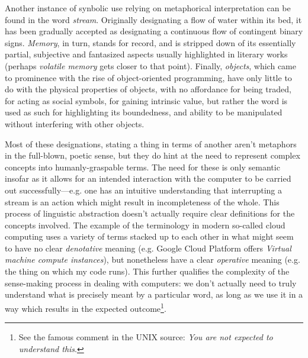 \documentclass{article}
\begin{document}
Another instance of synbolic use relying on metaphorical interpretation can be found in the word \emph{stream}. Originally designating a flow of water within its bed, it has been gradually accepted as designating a continuous flow of contingent binary signs. \emph{Memory}, in turn, stands for record, and is stripped down of its essentially partial, subjective and fantasized aspects usually highlighted in literary works (perhaps \emph{volatile memory} gets closer to that point). Finally, \emph{objects}, which came to prominence with the rise of object-oriented programming, have only little to do with the physical properties of objects, with no affordance for being traded, for acting as social symbols, for gaining intrinsic value, but rather the word is used as such for highlighting its boundedness, and ability to be manipulated without interfering with other objects.

Most of these designations, stating a thing in terms of another aren't metaphors in the full-blown, poetic sense, but they do hint at the need to represent complex concepts into humanly-graspable terms. The need for these is only semantic insofar as it allows for an intended interaction with the computer to be carried out successfully—e.g. one has an intuitive understanding that interrupting a stream is an action which might result in incompleteness of the whole. This process of linguistic abstraction doesn't actually require clear definitions for the concepts involved. The example of the terminology in modern so-called cloud computing uses a variety of terms stacked up to each other in what might seem to have no clear \emph{denotative} meaning (e.g. Google Cloud Platform offers \emph{Virtual machine compute instances}), but nonetheless have a clear \emph{operative} meaning (e.g. the thing on which my code runs). This further qualifies the complexity of the sense-making process in dealing with computers: we don't actually need to truly understand what is precisely meant by a particular word, as long as we use it in a way which results in the expected outcome\footnote{See the famous comment in the UNIX source: \emph{You are not expected to understand this}.}.
\end{document}
